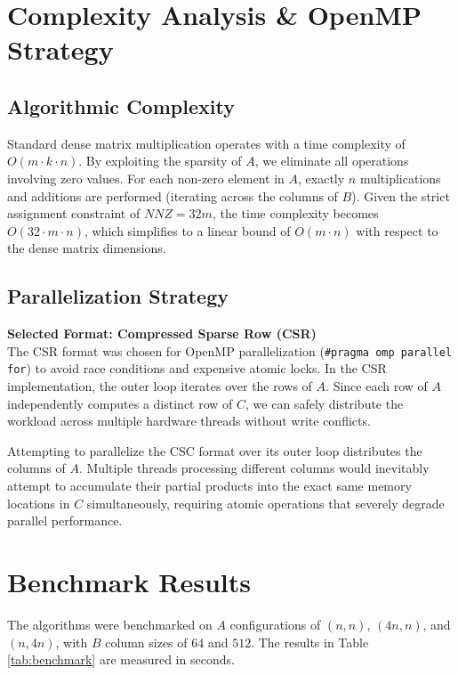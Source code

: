 \documentclass[a4paper,11pt]{article}
\begin{document}
\section{Complexity Analysis \& OpenMP Strategy}

\subsection{Algorithmic Complexity}
Standard dense matrix multiplication operates with a time complexity of $O(m \cdot k \cdot n)$. By exploiting the sparsity of $A$, we eliminate all operations involving zero values. For each non-zero element in $A$, exactly $n$ multiplications and additions are performed (iterating across the columns of $B$). Given the strict assignment constraint of $NNZ = 32m$, the time complexity becomes $O(32 \cdot m \cdot n)$, which simplifies to a linear bound of $O(m \cdot n)$ with respect to the dense matrix dimensions.

\subsection{Parallelization Strategy}
\textbf{Selected Format: Compressed Sparse Row (CSR)} \\
The CSR format was chosen for OpenMP parallelization (\texttt{\#pragma omp parallel for}) to avoid race conditions and expensive atomic locks. In the CSR implementation, the outer loop iterates over the rows of $A$. Since each row of $A$ independently computes a distinct row of $C$, we can safely distribute the workload across multiple hardware threads without write conflicts. 

Attempting to parallelize the CSC format over its outer loop distributes the columns of $A$. Multiple threads processing different columns would inevitably attempt to accumulate their partial products into the exact same memory locations in $C$ simultaneously, requiring atomic operations that severely degrade parallel performance.

\section{Benchmark Results}
The algorithms were benchmarked on $A$ configurations of $(n, n)$, $(4n, n)$, and $(n, 4n)$, with $B$ column sizes of $64$ and $512$. The results in Table \ref{tab:benchmark} are measured in seconds.
\end{document}
